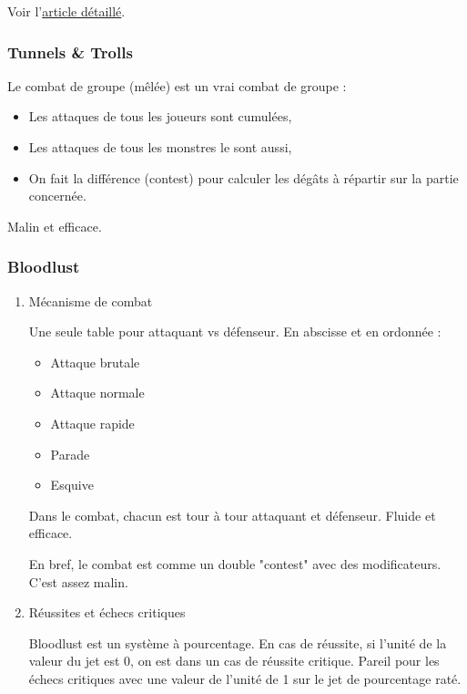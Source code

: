\documentclass[a4paper, 11pt, twoside]{article}
\begin{document}
Voir l'\href{https://github.com/orey/jdr/tree/master/Fudge-fr}{article détaillé}.

\subsubsection{Tunnels \& Trolls}
\label{sec:orge252b70}

Le combat de groupe (mêlée) est un vrai combat de groupe :
\begin{itemize}
\item Les attaques de tous les joueurs sont cumulées,
\item Les attaques de tous les monstres le sont aussi,
\item On fait la différence (contest) pour calculer les dégâts à répartir sur la partie concernée.
\end{itemize}

Malin et efficace.

\subsubsection{Bloodlust}
\label{sec:org65d807e}

\begin{enumerate}
\item Mécanisme de combat
\label{sec:org1e3305b}

Une seule table pour attaquant vs défenseur. En abscisse et en ordonnée :
\begin{itemize}
\item Attaque brutale
\item Attaque normale
\item Attaque rapide
\item Parade
\item Esquive
\end{itemize}

Dans le combat, chacun est tour à tour attaquant et défenseur. Fluide et efficace.

En bref, le combat est comme un double "contest" avec des modificateurs. C'est assez malin.

\item Réussites et échecs critiques
\label{sec:org6d93681}

Bloodlust est un système à pourcentage. En cas de réussite, si l'unité de la valeur du jet est 0, on est dans un cas de réussite critique. Pareil pour les échecs critiques avec une valeur de l'unité de 1 sur le jet de pourcentage raté.
\end{enumerate}
\end{document}
